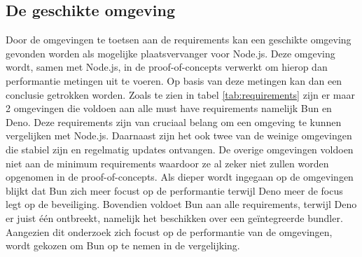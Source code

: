 \subsection{De geschikte omgeving}
Door de omgevingen te toetsen aan de requirements kan een geschikte 
omgeving gevonden worden als mogelijke plaatsvervanger voor Node.js.
Deze omgeving wordt, samen met Node.js, in de proof-of-concepts verwerkt om hierop dan performantie metingen uit te voeren.
Op basis van deze metingen kan dan een conclusie getrokken worden.
Zoals te zien in tabel \ref{tab:requirements} zijn er maar 2 omgevingen die voldoen aan alle must have requirements namelijk Bun en Deno. 
Deze requirements zijn van cruciaal belang om een omgeving te kunnen vergelijken met Node.js. 
Daarnaast zijn het ook twee van de weinige omgevingen die stabiel zijn en regelmatig updates ontvangen. 
De overige omgevingen voldoen niet aan de minimum requirements waardoor ze al zeker niet zullen worden opgenomen in de proof-of-concepts.
Als dieper wordt ingegaan op de omgevingen blijkt dat Bun zich meer focust op de performantie terwijl Deno meer de focus legt op de beveiliging.
Bovendien voldoet Bun aan alle requirements, terwijl Deno er juist één ontbreekt, namelijk het beschikken over een geïntegreerde bundler. 
Aangezien dit onderzoek zich focust op de performantie van de omgevingen, wordt gekozen om Bun op te nemen in de vergelijking.